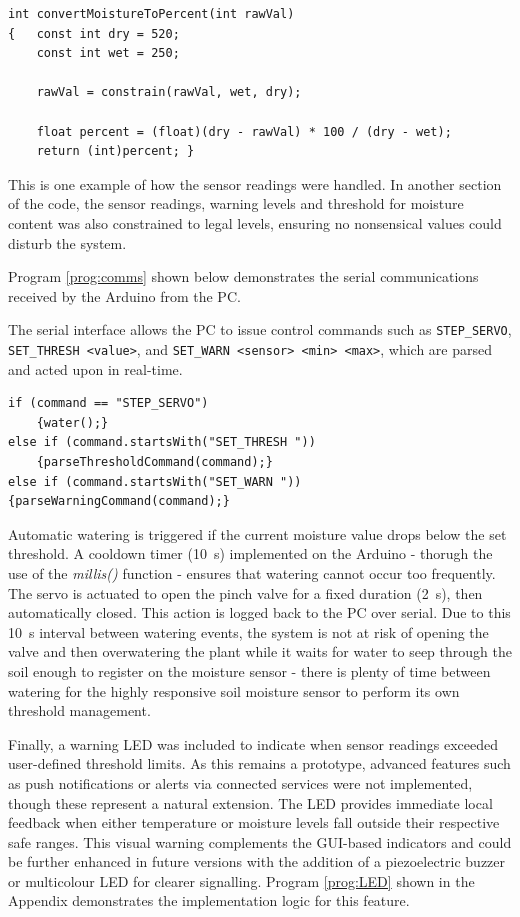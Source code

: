\documentclass[a4paper,11pt]{article}
\begin{document}
\begin{lstlisting}[style=cpp-style, 
caption={Arduino moisture conversion}, label={prog:moist}]
int convertMoistureToPercent(int rawVal)
{   const int dry = 520;
    const int wet = 250;

    rawVal = constrain(rawVal, wet, dry);

    float percent = (float)(dry - rawVal) * 100 / (dry - wet);
    return (int)percent; }
\end{lstlisting}

This is one example of how the sensor readings were handled.
In another section of the code, the sensor readings,
warning levels and threshold for moisture content
was also constrained to legal levels, ensuring 
no nonsensical values could disturb the system.

Program \ref{prog:comms} shown below demonstrates the serial communications
received by the Arduino from the PC.

The serial interface allows the PC to issue control commands such as 
\texttt{STEP\_SERVO}, \texttt{SET\_THRESH <value>}, and 
\texttt{SET\_WARN <sensor> <min> <max>}, which are parsed and acted upon 
in real-time.

\begin{lstlisting}[style=cpp-style, 
caption={Communication with the PC}, label={prog:comms}]
if (command == "STEP_SERVO")
    {water();}
else if (command.startsWith("SET_THRESH "))
    {parseThresholdCommand(command);}
else if (command.startsWith("SET_WARN "))
{parseWarningCommand(command);}
\end{lstlisting}

Automatic watering is triggered if the current moisture value drops below 
the set threshold. A cooldown timer (\SI{10}{\second}) implemented on the Arduino - 
thorugh the use of the \textit{millis()} function -
ensures that watering cannot occur too frequently. 
The servo is actuated to open the 
pinch valve for a fixed duration (\SI{2}{\second}), then automatically closed. 
This action is logged back to the PC over serial.
Due to this \SI{10}{\second} interval between watering events,
the system is not at risk of opening the valve 
and then overwatering the plant while it waits for water
to seep through the soil enough to register on the moisture sensor - 
there is plenty of time between watering for the highly responsive
soil moisture sensor to perform its own threshold management.

Finally, a warning LED was included to indicate when sensor readings 
exceeded user-defined threshold limits. 
As this remains a prototype, advanced features such as push notifications 
or alerts via connected services were not implemented, 
though these represent a natural extension. 
The LED provides immediate local feedback when either temperature or moisture 
levels fall outside their respective safe ranges. 
This visual warning complements the GUI-based indicators and could be further enhanced 
in future versions with the addition of a piezoelectric buzzer 
or multicolour LED for clearer signalling. 
Program \ref{prog:LED} shown in the Appendix demonstrates 
the implementation logic for this feature.
\end{document}
